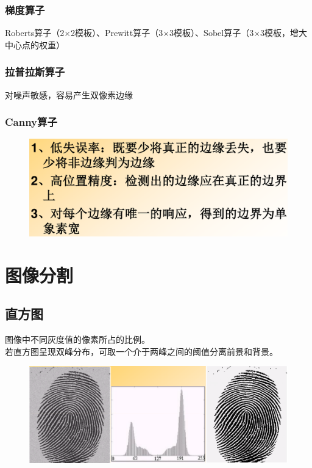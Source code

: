 \documentclass[11pt]{article}
\begin{document}
\subsubsection{梯度算子}
Roberts算子（2$\times$2模板）、Prewitt算子（3$\times$3模板）、Sobel算子（3$\times$3模板，增大中心点的权重）

\subsubsection{拉普拉斯算子}
对噪声敏感，容易产生双像素边缘

\subsubsection{Canny算子}
\begin{figure}[htb]
    \centering
    \includegraphics[scale=0.1]{imgs/canny.png}
\end{figure}


\section{图像分割}

\subsection{直方图}
图像中不同灰度值的像素所占的比例。  \\
若直方图呈现双峰分布，可取一个介于两峰之间的阈值分离前景和背景。
\begin{figure}[htb]
    \centering
    \includegraphics[scale=0.1]{imgs/bimodal.png}
\end{figure}
\end{document}
